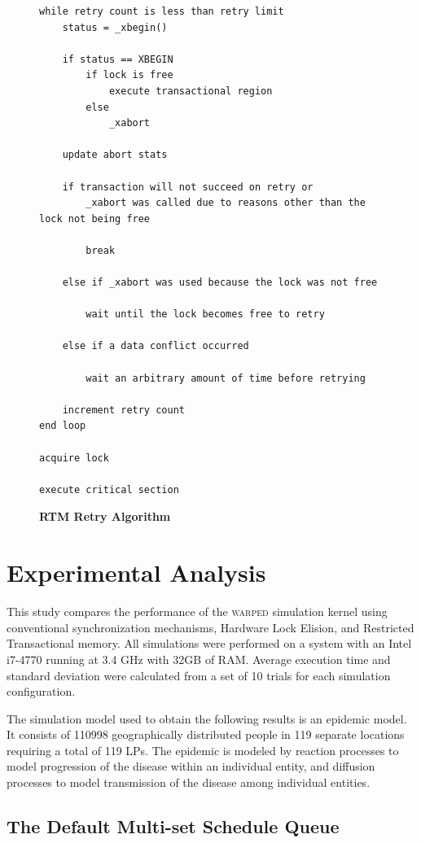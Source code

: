 \documentclass[11pt]{book}
\begin{document}
\begin{figure}
\begin{verbatim}
while retry count is less than retry limit
    status = _xbegin()

    if status == XBEGIN
        if lock is free
            execute transactional region
        else
            _xabort

    update abort stats

    if transaction will not succeed on retry or 
        _xabort was called due to reasons other than the lock not being free

        break

    else if _xabort was used because the lock was not free

        wait until the lock becomes free to retry

    else if a data conflict occurred
        
        wait an arbitrary amount of time before retrying

    increment retry count
end loop

acquire lock

execute critical section

\end{verbatim}
\caption{\textbf{RTM Retry Algorithm}}\label{rtm_retry}
\end{figure}

\chapter{Experimental Analysis}

This study compares the performance of the \textsc{warped} simulation kernel
using conventional synchronization mechanisms, Hardware Lock Elision, and
Restricted Transactional memory.  All simulations were performed on a system
with an Intel i7-4770 running at 3.4 GHz with 32GB of RAM.  Average execution
time and standard deviation were calculated from a set of 10 trials for each
simulation configuration.

The simulation model used to obtain the following results is an epidemic model.  It
consists of 110998 geographically distributed people in 119 separate locations requiring a
total of 119 LPs.  The epidemic is modeled by reaction processes to model progression of
the disease within an individual entity, and diffusion processes to model transmission of
the disease among individual entities.

\section{The Default Multi-set Schedule Queue}
\end{document}
